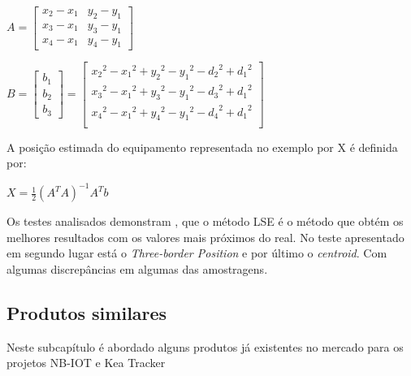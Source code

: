 \begin{center}



$A=\begin{bmatrix}
x_{2}-x_{1} & y_{2}-y_{1}\\
x_{3}-x_{1} & y_{3}-y_{1}\\
x_{4}-x_{1} & y_{4}-y_{1}
\end{bmatrix}$

$B=\begin{bmatrix}
b_{1}\\
b_{2}\\
b_{3}
\end{bmatrix}=\begin{bmatrix}
{x_{2}}^2-{x_{1}}^2 + {y_{2}}^2-{y_{1}}^2 - {d_{2}}^2 + {d_{1}}^2 \\
{x_{3}}^2-{x_{1}}^2 + {y_{3}}^2-{y_{1}}^2 - {d_{3}}^2 + {d_{1}}^2 \\
{x_{4}}^2-{x_{1}}^2 + {y_{4}}^2-{y_{1}}^2 - {d_{4}}^2 + {d_{1}}^2 \\
\end{bmatrix} $

\end{center}

\par A posição estimada do equipamento representada no exemplo por X é definida por:



\par
\begin{center}
$ X= \frac{1}{2}(A^T A)^{-1} A^T b$
\end{center}

\par Os testes analisados demonstram\cite{Wang2013} , que o método LSE é o método que obtém os melhores resultados com os valores mais próximos do real. No teste apresentado em segundo lugar está o \textit{Three-border Position} e por último o \textit{centroid}. Com algumas discrepâncias em algumas das amostragens.

\subsection{Produtos similares} \label{produtos}

\par Neste subcapítulo é abordado alguns produtos já existentes no mercado para os projetos NB-IOT e Kea Tracker
